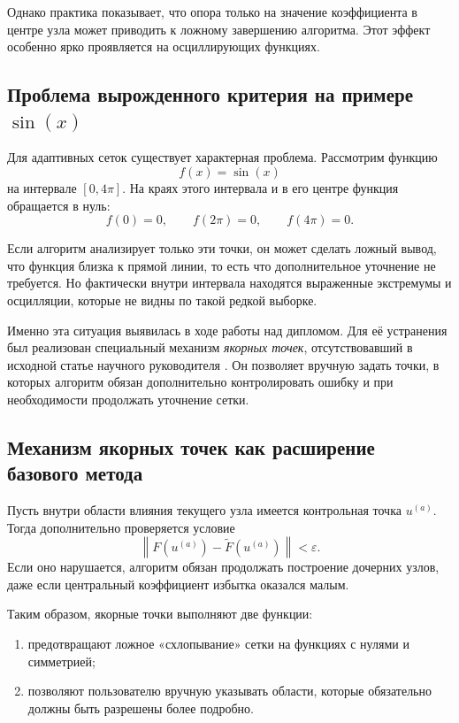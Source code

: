 Однако практика показывает, что опора только на значение коэффициента в центре узла может приводить к ложному завершению алгоритма. Этот эффект особенно ярко проявляется на осциллирующих функциях.

\subsection{Проблема вырожденного критерия на примере $\sin(x)$}

Для адаптивных сеток существует характерная проблема. Рассмотрим функцию
\begin{equation}
    f(x)=\sin(x)
\end{equation}
на интервале $[0,4\pi]$. На краях этого интервала и в его центре функция обращается в нуль:
\begin{equation}
    f(0)=0, \qquad f(2\pi)=0, \qquad f(4\pi)=0.
\end{equation}

Если алгоритм анализирует только эти точки, он может сделать ложный вывод, что функция близка к прямой линии, то есть что дополнительное уточнение не требуется. Но фактически внутри интервала находятся выраженные экстремумы и осцилляции, которые не видны по такой редкой выборке.

Именно эта ситуация выявилась в ходе работы над дипломом. Для её устранения был реализован специальный механизм \textit{якорных точек}, отсутствовавший в исходной статье научного руководителя \cite{Morozov2024}. Он позволяет вручную задать точки, в которых алгоритм обязан дополнительно контролировать ошибку и при необходимости продолжать уточнение сетки.

\subsection{Механизм якорных точек как расширение базового метода}

Пусть внутри области влияния текущего узла имеется контрольная точка $u^{(a)}$. Тогда дополнительно проверяется условие
\begin{equation}
    \left\|F\left(u^{(a)}\right) - \widetilde{F}\left(u^{(a)}\right)\right\| < \varepsilon.
\end{equation}
Если оно нарушается, алгоритм обязан продолжать построение дочерних узлов, даже если центральный коэффициент избытка оказался малым.

Таким образом, якорные точки выполняют две функции:
\begin{enumerate}
    \item предотвращают ложное «схлопывание» сетки на функциях с нулями и симметрией;
    \item позволяют пользователю вручную указывать области, которые обязательно должны быть разрешены более подробно.
\end{enumerate}

